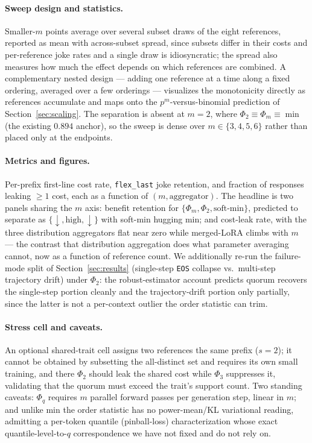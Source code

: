 \documentclass[11pt]{article}
\begin{document}
\paragraph{Sweep design and statistics.} Smaller-$m$ points average over several subset draws of the eight references, reported as mean with across-subset spread, since subsets differ in their costs and per-reference joke rates and a single draw is idiosyncratic; the spread also measures how much the effect depends on which references are combined. A complementary nested design --- adding one reference at a time along a fixed ordering, averaged over a few orderings --- visualizes the monotonicity directly as references accumulate and maps onto the $p^m$-versus-binomial prediction of Section~\ref{sec:scaling}. The separation is absent at $m = 2$, where $\Phi_2 \equiv \Phi_m \equiv \min$ (the existing $0.894$ anchor), so the sweep is dense over $m \in \{3, 4, 5, 6\}$ rather than placed only at the endpoints.

\paragraph{Metrics and figures.} Per-prefix first-line cost rate, \texttt{flex\_last} joke retention, and fraction of responses leaking $\ge 1$ cost, each as a function of $(m, \text{aggregator})$. The headline is two panels sharing the $m$ axis: benefit retention for $\{\Phi_m, \Phi_2, \text{soft-min}\}$, predicted to separate as $\{\downarrow, \text{high}, \downarrow\}$ with soft-min hugging min; and cost-leak rate, with the three distribution aggregators flat near zero while merged-LoRA climbs with $m$ --- the contrast that distribution aggregation does what parameter averaging cannot, now as a function of reference count. We additionally re-run the failure-mode split of Section~\ref{sec:results} (single-step \texttt{EOS} collapse vs.\ multi-step trajectory drift) under $\Phi_2$: the robust-estimator account predicts quorum recovers the single-step portion cleanly and the trajectory-drift portion only partially, since the latter is not a per-context outlier the order statistic can trim.

\paragraph{Stress cell and caveats.} An optional shared-trait cell assigns two references the same prefix ($s = 2$); it cannot be obtained by subsetting the all-distinct set and requires its own small training, and there $\Phi_2$ should leak the shared cost while $\Phi_3$ suppresses it, validating that the quorum must exceed the trait's support count. Two standing caveats: $\Phi_q$ requires $m$ parallel forward passes per generation step, linear in $m$; and unlike min the order statistic has no power-mean/KL variational reading, admitting a per-token quantile (pinball-loss) characterization whose exact quantile-level-to-$q$ correspondence we have not fixed and do not rely on.
\end{document}
